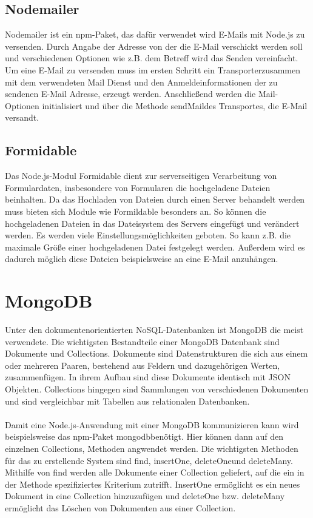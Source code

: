\subsection{Nodemailer}
Nodemailer ist ein \glqq npm\grqq-Paket, das dafür verwendet wird E-Mails mit Node.js zu versenden. Durch Angabe der Adresse von der die E-Mail verschickt werden soll und verschiedenen Optionen wie z.B. dem Betreff wird das Senden vereinfacht. Um eine E-Mail zu versenden muss im ersten Schritt ein \glqq Transporter\grqq zusammen mit dem verwendeten Mail Dienst und den Anmeldeinformationen der zu sendenen E-Mail Adresse, erzeugt werden. Anschließend werden die Mail-Optionen initialisiert und über die Methode \glqq sendMail\grqq des Transportes, die E-Mail versandt.

\subsection{Formidable}
Das Node.js-Modul Formidable dient zur serverseitigen Verarbeitung von Formulardaten, insbesondere von Formularen die hochgeladene Dateien beinhalten. Da das Hochladen von Dateien durch einen Server behandelt werden muss bieten sich Module wie Formildable besonders an. So können die hochgeladenen Dateien in das Dateisystem des Servers eingefügt und verändert werden. Es werden viele Einstellungsmöglichkeiten geboten. So kann z.B. die maximale Größe einer hochgeladenen Datei festgelegt werden. Außerdem wird es dadurch möglich diese Dateien beispielsweise an eine E-Mail anzuhängen.

\section{MongoDB}
Unter den dokumentenorientierten NoSQL-Datenbanken ist MongoDB die meist verwendete. Die wichtigsten Bestandteile einer MongoDB Datenbank sind Dokumente und Collections. Dokumente sind Datenstrukturen die sich aus einem oder mehreren Paaren, bestehend aus Feldern und dazugehörigen Werten, zusammenfügen. In ihrem Aufbau sind diese Dokumente identisch mit JSON Objekten. Collections hingegen sind Sammlungen von verschiedenen Dokumenten und sind vergleichbar mit Tabellen aus relationalen Datenbanken.
\\
\\
Damit eine Node.js-Anwendung mit einer MongoDB kommunizieren kann wird beispielsweise das \glqq npm\grqq-Paket \glqq mongodb\grqq benötigt. Hier können dann auf den einzelnen Collections, Methoden angwendet werden. Die wichtigsten Methoden für das zu erstellende System sind \glqq find\grqq , \glqq insertOne\grqq , \glqq deleteOne\grqq und \glqq deleteMany\grqq. Mithilfe von find werden alle Dokumente einer Collection geliefert, auf die ein in der Methode spezifiziertes Kriterium zutrifft. InsertOne ermöglicht es ein neues Dokument in eine Collection hinzuzufügen und deleteOne bzw. deleteMany ermöglicht das Löschen von Dokumenten aus einer Collection.
